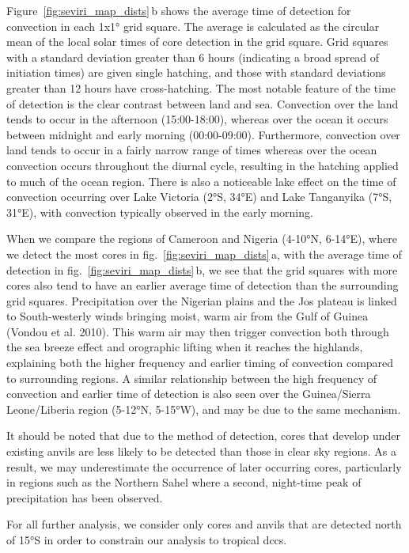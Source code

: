 Figure~\ref{fig:seviri_map_dists}\,b shows the average time of detection for convection in each
1x1° grid square. The average is calculated as the circular mean of the
local solar times of core detection in the grid square. Grid squares
with a standard deviation greater than 6 hours (indicating a broad
spread of initiation times) are given single hatching, and those with
standard deviations greater than 12 hours have cross-hatching. The most
notable feature of the time of detection is the clear contrast between
land and sea. Convection over the land tends to occur in the afternoon
(15:00-18:00), whereas over the ocean it occurs between midnight and
early morning (00:00-09:00). Furthermore, convection over land tends to
occur in a fairly narrow range of times whereas over the ocean
convection occurs throughout the diurnal cycle, resulting in the
hatching applied to much of the ocean region. There is also a noticeable
lake effect on the time of convection occurring over Lake Victoria (2°S,
34°E) and Lake Tanganyika (7°S, 31°E), with convection typically
observed in the early morning.

When we compare the regions of Cameroon and Nigeria (4-10°N, 6-14°E),
where we detect the most cores in fig.~\ref{fig:seviri_map_dists}\,a, with the average time of
detection in fig.~\ref{fig:seviri_map_dists}\,b, we see that the grid squares with more cores
also tend to have an earlier average time of detection than the
surrounding grid squares. Precipitation over the Nigerian plains and the
Jos plateau is linked to South-westerly winds bringing moist, warm air
from the Gulf of Guinea (Vondou et al. 2010). This warm air may then
trigger convection both through the sea breeze effect and orographic
lifting when it reaches the highlands, explaining both the higher
frequency and earlier timing of convection compared to surrounding
regions. A similar relationship between the high frequency of convection
and earlier time of detection is also seen over the Guinea/Sierra
Leone/Liberia region (5-12°N, 5-15°W), and may be due to the same
mechanism.

It should be noted that due to the method of detection, cores that
develop under existing anvils are less likely to be detected than those
in clear sky regions. As a result, we may underestimate the occurrence
of later occurring cores, particularly in regions such as the Northern
Sahel where a second, night-time peak of precipitation has been
observed.

For all further analysis, we consider only cores and anvils that are
detected north of 15°S in order to constrain our analysis to tropical
\acrshort{dcc}s.

